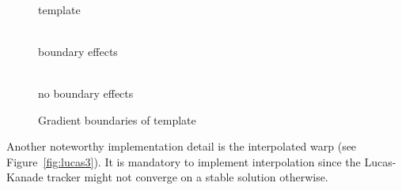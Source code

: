 \documentclass[12pt,a4paper,oneside,openright]{book}
\newcommand{\fig}[1]{Figure~\ref{fig:#1}}
\begin{document}
\begin{CJK}{UTF8}{}
\begin{figure}[htbp]
  \begin{center}
    \begin{minipage}[t]{.2\textwidth}
      \begin{center}
        \\
        template
      \end{center}
    \end{minipage}
    \begin{minipage}[t]{.37\textwidth}
      \begin{center}
        \\
        boundary effects
      \end{center}
     \end{minipage}
     \begin{minipage}[t]{.37\textwidth}
      \begin{center}
        \\
        no boundary effects
      \end{center}
    \end{minipage}
    \caption{Gradient boundaries of template\label{fig:lucas2}}
  \end{center}
\end{figure}
Another noteworthy implementation detail is the interpolated warp (see \fig{lucas3}). It is mandatory to implement interpolation since the Lucas-Kanade tracker might not converge on a stable solution otherwise.
\begin{figure}[htbp]

\end{figure}
\end{CJK}
\end{document}
